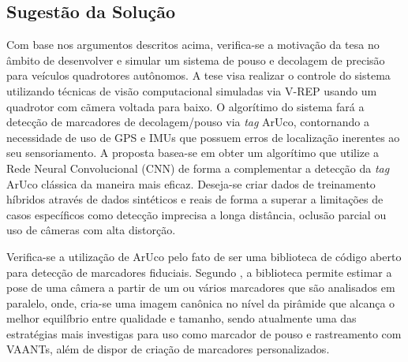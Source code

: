 \subsection{Sugestão da Solução}

Com base nos argumentos descritos acima, verifica-se a motivação da tesa no âmbito de desenvolver e simular um sistema de pouso e decolagem de precisão para veículos quadrotores autônomos. A tese visa realizar o controle do sistema utilizando técnicas de visão computacional simuladas via V-REP usando um quadrotor com cãmera voltada para baixo. O algorítimo do sistema fará a detecção de marcadores de decolagem/pouso via \textit{tag} ArUco, contornando a necessidade de uso de GPS e IMUs que possuem erros de localização inerentes ao seu sensoriamento. A proposta basea-se em obter um algorítimo que utilize a Rede Neural Convolucional (CNN) de forma a complementar a detecção da \textit{tag} ArUco clássica da maneira mais eficaz.  Deseja-se criar dados de treinamento híbridos através de dados sintéticos e reais de forma a superar a limitações de casos específicos como detecção imprecisa a longa distância, oclusão parcial ou uso de câmeras com alta distorção. 

Verifica-se a utilização de ArUco pelo fato de ser uma biblioteca de código aberto para detecção de marcadores fiduciais. Segundo \citet{Aruco2014}, a biblioteca permite estimar a pose de uma câmera a partir de um ou vários marcadores que são analisados em paralelo, onde, cria-se uma imagem canônica no nível da pirâmide que alcança o melhor equilíbrio entre qualidade e tamanho, sendo atualmente uma das estratégias mais investigas para uso como marcador de pouso e rastreamento com VAANTs, além de dispor de criação de marcadores personalizados. 




